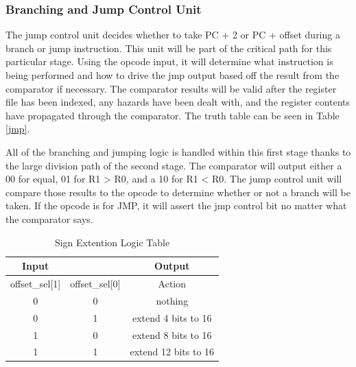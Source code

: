 	\subsubsection{Branching and Jump Control Unit}
    The jump control unit decides whether to take PC + 2 or PC + offset during a branch or jump instruction. 
    This unit will be part of the critical path for this particular stage. Using the opcode input, it will determine what instruction is being performed and how to drive the jmp output based off the result from the comparator if necessary. The comparator results will be valid after the register file has been indexed, any hazards have been dealt with, and the register contents have propagated through the comparator. The truth table can be seen in Table \ref{jmp}. 
    
    All of the branching and jumping logic is handled within this first stage thanks to the large division path of the second stage. The comparator will output either a 00 for equal, 
    01 for R1 > R0, and a 10 for R1 < R0. The jump control unit will compare those results to the opcode to determine whether or not a branch will be taken. If the opcode is for JMP, it will assert the jmp control bit no matter what the comparator says.
    
    \begin{table}[htbp]
        \caption{Sign Extention Logic Table}
        \label{signextend}
        \centering
        \begin{tabular}{c c | c }
        Input         &               & Output\\
        \hline
        offset\_sel[1] & offset\_sel[0] & Action\\
        0             & 0             & nothing\\
        0             & 1             & extend 4 bits to 16\\
        1             & 0             & extend 8 bits to 16\\
        1             & 1             & extend 12 bits to 16\\
        \end{tabular}
    \end{table}
    
    \newpage
    
    
